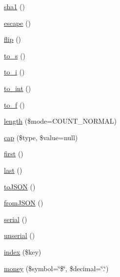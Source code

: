 \begin{DoxyCompactItemize}
\item 
\hyperlink{class_pierce_moore_1_1_ruby_p_h_p_1_1r_a7751a3691d09eba1c3d390fdde2c4f4f}{sha1} ()
\item 
\hyperlink{class_pierce_moore_1_1_ruby_p_h_p_1_1r_ab4e6060d5b0dd93113194ba83534d385}{escape} ()
\item 
\hyperlink{class_pierce_moore_1_1_ruby_p_h_p_1_1r_ab7b978294481794664ea5ffa6530e020}{flip} ()
\item 
\hyperlink{class_pierce_moore_1_1_ruby_p_h_p_1_1r_a4968be1bfca5da3a210d46e21bd080ff}{to\-\_\-s} ()
\item 
\hyperlink{class_pierce_moore_1_1_ruby_p_h_p_1_1r_aa1ea52bbf266b7ba98c1198ca335ddf1}{to\-\_\-i} ()
\item 
\hyperlink{class_pierce_moore_1_1_ruby_p_h_p_1_1r_a2d59e8b9284086c0dd59203615f28d2e}{to\-\_\-int} ()
\item 
\hyperlink{class_pierce_moore_1_1_ruby_p_h_p_1_1r_ad12032cdf12c784eafa8994f13f464df}{to\-\_\-f} ()
\item 
\hyperlink{class_pierce_moore_1_1_ruby_p_h_p_1_1r_a93564c0bb378f8d37470946df4d09ceb}{length} (\$mode=C\-O\-U\-N\-T\-\_\-\-N\-O\-R\-M\-A\-L)
\item 
\hyperlink{class_pierce_moore_1_1_ruby_p_h_p_1_1r_a6919ea74ebb93cd28fee10d172ebc4c4}{cap} (\$type, \$value=null)
\item 
\hyperlink{class_pierce_moore_1_1_ruby_p_h_p_1_1r_ac73eef9ff76ea330c0dab36ca448b90d}{first} ()
\item 
\hyperlink{class_pierce_moore_1_1_ruby_p_h_p_1_1r_ac90cadb327363232bb2d83a4f8ebd613}{last} ()
\item 
\hyperlink{class_pierce_moore_1_1_ruby_p_h_p_1_1r_a2108d0f07e9bca6160bf5885703de972}{to\-J\-S\-O\-N} ()
\item 
\hyperlink{class_pierce_moore_1_1_ruby_p_h_p_1_1r_ae456068dd57aa56c7fc891a526e67c32}{from\-J\-S\-O\-N} ()
\item 
\hyperlink{class_pierce_moore_1_1_ruby_p_h_p_1_1r_a20d848af138f92c4604f0bcecce267e2}{serial} ()
\item 
\hyperlink{class_pierce_moore_1_1_ruby_p_h_p_1_1r_a5664dc3d9f1d71ac463a833d37583e84}{unserial} ()
\item 
\hyperlink{class_pierce_moore_1_1_ruby_p_h_p_1_1r_ada723c8fc4c1599c3f0a5a73698ef7fd}{index} (\$key)
\item 
\hyperlink{class_pierce_moore_1_1_ruby_p_h_p_1_1r_a7755db2baa1c58774d9cf1c5c82676a1}{money} (\$symbol=\char`\"{}\$\char`\"{}, \$decimal=\char`\"{}.\char`\"{})
\item 

\end{DoxyCompactItemize}
